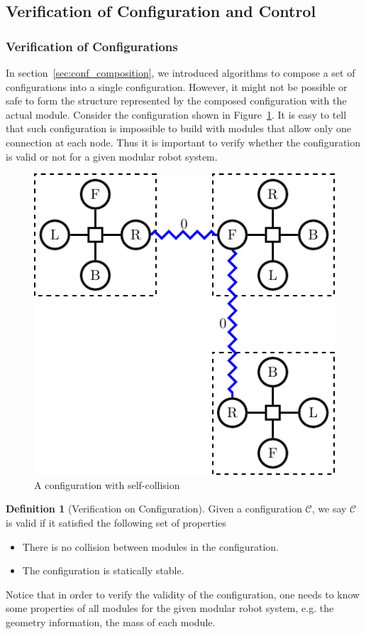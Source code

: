 \documentclass[conference]{IEEEtran}
\theoremstyle{definition}
\newtheorem{definition}{Definition}[section]
\begin{document}
\subsection{ Verification of Configuration and Control}
\subsubsection{Verification of Configurations} In section~\ref{sec:conf_composition}, we introduced algorithms to compose a set of configurations into a single configuration. However, it might not be possible  or safe to form the structure represented by the composed configuration with the actual module. Consider the configuration shown in Figure~\ref{fig:smores_conf_collision}. It is easy to tell that such configuration is impossible to build with modules that allow only one connection at each node. Thus it is important to verify whether the configuration is valid or not for a given modular robot system.

\begin{figure}
\begin{center}
\includegraphics[width=0.5\columnwidth]{images/tikz/smores_conf_collision.pdf}
\end{center}
\caption{A configuration with self-collision}
\label{fig:smores_conf_collision}
\end{figure}

\begin{definition}[Verification on Configuration]
Given a configuration $\mathcal{C}$, we say $\mathcal{C}$ is valid if it satisfied the following set of properties
\begin{itemize}
\item There is no collision between modules in the configuration.
\item The configuration is statically stable.
\end{itemize}
Notice that in order to verify the validity of the configuration, one needs to know some properties of all modules for the given modular robot system, e.g. the geometry information, the mass of each module.
\end{definition}
\end{document}
